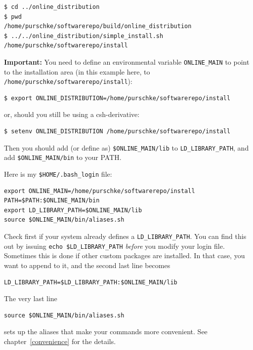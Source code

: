\documentclass{article}[11pt]
\begin{document}
\begin{verbatim} 
$ cd ../online_distribution
$ pwd
/home/purschke/softwarerepo/build/online_distribution
$ ../../online_distribution/simple_install.sh /home/purschke/softwarerepo/install
\end{verbatim}
 
{\bf Important:} You need to define an environmental variable
\verb|ONLINE_MAIN| to point to the installation area (in this example
here, to \verb|/home/purschke/softwarerepo/install|):

\begin{verbatim} 
$ export ONLINE_DISTRIBUTION=/home/purschke/softwarerepo/install
\end{verbatim}

or, should you still be using a csh-derivative:

\begin{verbatim} 
$ setenv ONLINE_DISTRIBUTION /home/purschke/softwarerepo/install
\end{verbatim}

Then you should add (or define as) \verb|$ONLINE_MAIN/lib| to
\verb|LD_LIBRARY_PATH|, and add \verb|$ONLINE_MAIN/bin| to your PATH.

Here is my \verb|$HOME/.bash_login| file:

\begin{verbatim} 
export ONLINE_MAIN=/home/purschke/softwarerepo/install
PATH=$PATH:$ONLINE_MAIN/bin
export LD_LIBRARY_PATH=$ONLINE_MAIN/lib
source $ONLINE_MAIN/bin/aliases.sh
\end{verbatim}

Check first if your system already defines a
\verb|LD_LIBRARY_PATH|. You can find this out by issuing
\verb|echo $LD_LIBRARY_PATH| \emph{before} you modify your login
file. Sometimes this is done if other custom packages are
installed. In that case, you want to append to it, and the
second last line becomes

\begin{verbatim} 
LD_LIBRARY_PATH=$LD_LIBRARY_PATH:$ONLINE_MAIN/lib
\end{verbatim}

The very last line 
\begin{verbatim} 
source $ONLINE_MAIN/bin/aliases.sh
\end{verbatim}

sets up the aliases that make your commands more convenient. See
chapter~\ref{convenience} for the details. 
\end{document}
